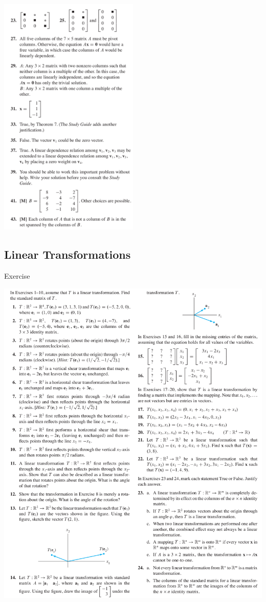\documentclass[a4paper,11pt,reqno]{amsart}
\numberwithin{equation}{section}
\begin{document}
\includegraphics[width=0.5\textwidth]{exercises/li_ans2.png}

\newpage

\subsection{Linear Transformations}
Exercise

\includegraphics[width=1.1\textwidth, height=1.35\textwidth]{exercises/lt.png}
\end{document}
